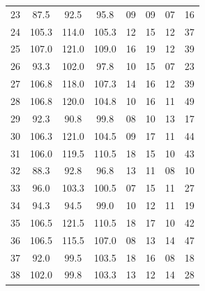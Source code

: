 \begin{mvtable}
\begin{tabular}{l|ccccccc}
23 & 87.5 & 92.5 & 95.8 & 09 & 09 & 07 & 16\\
24 & 105.3 & 114.0 & 105.3 & 12 & 15 & 12 & 37\\
25 & 107.0 & 121.0 & 109.0 & 16 & 19 & 12 & 39\\
26 & 93.3 & 102.0 & 97.8 & 10 & 15 & 07 & 23\\
27 & 106.8 & 118.0 & 107.3 & 14 & 16 & 12 & 39\\
28 & 106.8 & 120.0 & 104.8 & 10 & 16 & 11 & 49\\
29 & 92.3 & 90.8 & 99.8 & 08 & 10 & 13 & 17\\
30 & 106.3 & 121.0 & 104.5 & 09 & 17 & 11 & 44\\
31 & 106.0 & 119.5 & 110.5 & 18 & 15 & 10 & 43\\
32 & 88.3 & 92.8 & 96.8 & 13 & 11 & 08 & 10\\
33 & 96.0 & 103.3 & 100.5 & 07 & 15 & 11 & 27\\
34 & 94.3 & 94.5 & 99.0 & 10 & 12 & 11 & 19\\
35 & 106.5 & 121.5 & 110.5 & 18 & 17 & 10 & 42\\
36 & 106.5 & 115.5 & 107.0 & 08 & 13 & 14 & 47\\
37 & 92.0 & 99.5 & 103.5 & 18 & 16 & 08 & 18\\
38 & 102.0 & 99.8 & 103.3 & 13 & 12 & 14 & 28\\
\bottomrule
\end{tabular}
\end{mvtable}
